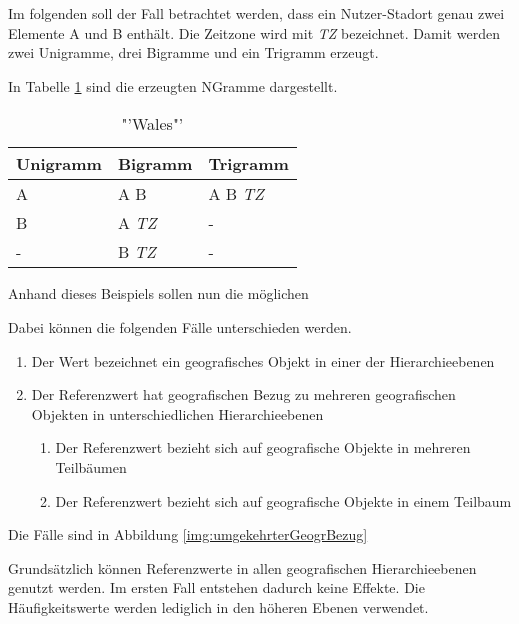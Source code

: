 					Im folgenden soll der Fall betrachtet werden, dass ein Nutzer-Stadort genau zwei Elemente A und B enthält.
					Die Zeitzone wird mit \textit{TZ} bezeichnet.  
					Damit werden zwei Unigramme, drei Bigramme und ein Trigramm erzeugt.

					In Tabelle \ref{tab:BeispielNGramme} sind die erzeugten NGramme dargestellt.

					\begin{table}[h]
					\centering
					\caption{"'Wales"'}
					\label{tab:BeispielNGramme}
					\begin{tabular}{|l|l|l|}
					\hline
					Unigramm & Bigramm 			& Trigramm  	  	\\ \hline \hline
					A        & A B 				& A B \textit{TZ} 	\\ \hline
					B        & A \textit{TZ}    & -			 	   	\\ \hline
					- 		 & B \textit{TZ}   	& -					\\ \hline
					\end{tabular}
					\end{table}   

					Anhand dieses Beispiels sollen nun die möglichen




				Dabei können die folgenden Fälle unterschieden werden.

				\begin{enumerate}
				  	\item Der Wert bezeichnet ein geografisches Objekt in einer der Hierarchieebenen
				  	\item Der Referenzwert hat geografischen Bezug zu mehreren geografischen Objekten in unterschiedlichen Hierarchieebenen
				  	\begin{enumerate}
				  		\item Der Referenzwert bezieht sich auf geografische Objekte in mehreren Teilbäumen
				  		\item Der Referenzwert bezieht sich auf geografische Objekte in einem Teilbaum
				  	\end{enumerate}
				  \end{enumerate}  

				Die Fälle sind in Abbildung \ref{img:umgekehrterGeogrBezug} 

				Grundsätzlich können Referenzwerte in allen geografischen Hierarchieebenen genutzt werden. 
				Im ersten Fall entstehen dadurch keine Effekte. 
				Die Häufigkeitswerte werden lediglich in den höheren Ebenen verwendet.




